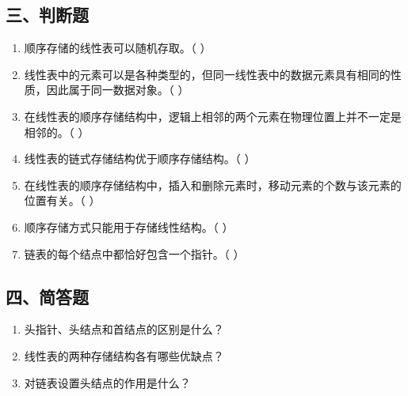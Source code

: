 \documentclass[12pt, a4paper]{article}
\begin{document}
\subsection*{三、判断题}
\begin{enumerate}
    \item 顺序存储的线性表可以随机存取。（ ）
    \item 线性表中的元素可以是各种类型的，但同一线性表中的数据元素具有相同的性质，因此属于同一数据对象。（ ）
    \item 在线性表的顺序存储结构中，逻辑上相邻的两个元素在物理位置上并不一定是相邻的。（ ）
    \item 线性表的链式存储结构优于顺序存储结构。（ ）
    \item 在线性表的顺序存储结构中，插入和删除元素时，移动元素的个数与该元素的位置有关。（ ）
    \item 顺序存储方式只能用于存储线性结构。（ ）
    \item 链表的每个结点中都恰好包含一个指针。（ ）
\end{enumerate}

\subsection*{四、简答题}
\begin{enumerate}
    \item 头指针、头结点和首结点的区别是什么？
    \item 线性表的两种存储结构各有哪些优缺点？
    \item 对链表设置头结点的作用是什么？
\end{enumerate}
\end{document}
